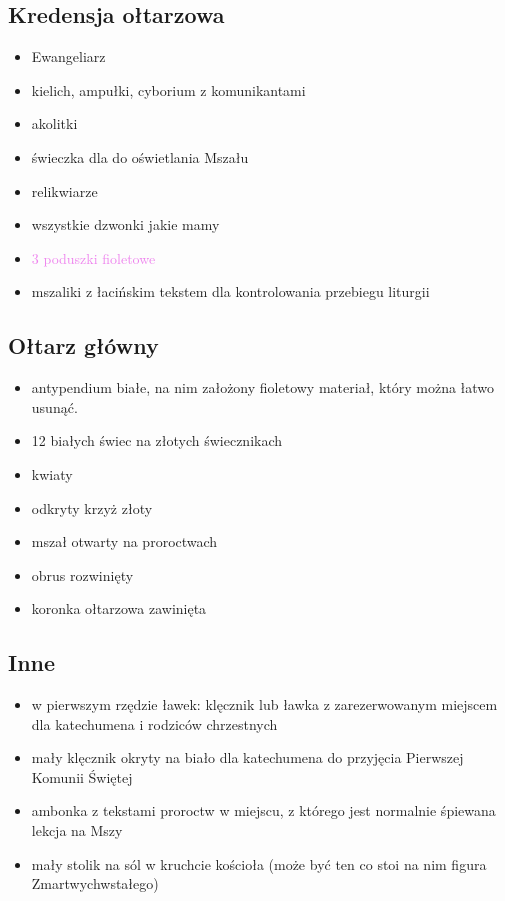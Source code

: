 \subsection{Kredensja ołtarzowa}
\begin{itemize}
	\item Ewangeliarz
	\item kielich, ampułki, cyborium z komunikantami
	\item akolitki
	\item świeczka dla  do oświetlania Mszału
	\item relikwiarze
	\item wszystkie dzwonki jakie mamy
	\item \textcolor{violet}{3 poduszki fioletowe}
	\item mszaliki z łacińskim tekstem dla kontrolowania przebiegu liturgii
\end{itemize}

\subsection{Ołtarz główny}
\begin{itemize}
	\item antypendium \textcolor{black!50}{białe}, na nim założony
	      {\color{violet}fioletowy} materiał, który można łatwo usunąć.
	\item 12 białych świec na złotych świecznikach
	\item kwiaty
	\item odkryty krzyż złoty
	\item mszał otwarty na proroctwach
	\item obrus rozwinięty
	\item koronka ołtarzowa zawinięta
\end{itemize}

\subsection{Inne}
\begin{itemize}
	\item w pierwszym rzędzie ławek: klęcznik lub ławka z zarezerwowanym
	      miejscem dla katechumena i rodziców chrzestnych
	\item mały klęcznik okryty na biało dla katechumena do przyjęcia Pierwszej
	      Komunii Świętej
	\item ambonka z tekstami proroctw w miejscu, z którego jest
	      normalnie śpiewana lekcja na Mszy
	\item mały stolik na sól w kruchcie kościoła (może być ten co stoi na nim
	      figura Zmartwychwstałego)
\end{itemize}

